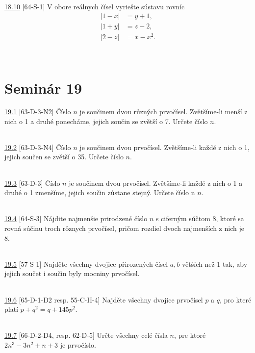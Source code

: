 \\

\noindent \ul{18.10} [64-S-1]
V obore reálnych čísel vyriešte sústavu rovníc
\begin{align*}
|1 - x| &= y + 1,\\
|1 + y| &= z - 2,\\
|2 - z| &= x - x^2.
\end{align*}

\\

\section*{Seminár 19}

\noindent \ul{19.1} [63-D-3-N2] Číslo $n$ je součinem dvou různých prvočísel.
Zvětšíme-li menší z nich o 1 a druhé ponecháme, jejich součin se zvětší o 7.
Určete číslo $n$.

\\

\noindent \ul{19.2} [63-D-3-N4] Číslo $n$ je součinem dvou prvočísel.
Zvětšíme-li každé z nich o 1, jejich součen se zvětší o 35. Určete číslo $n$.

\\

\noindent \ul{19.3} [63-D-3] Číslo $n$ je součinem dvou prvočísel. Zvětšíme-li
každé z nich o 1 a druhé o 1 zmenšíme, jejich součin zůstane stejný. Určete
číslo n $n$.

\\

\noindent \ul{19.4} [64-S-3]
Nájdite najmenšie prirodzené číslo $n$ s ciferným súčtom 8, ktoré sa rovná súčinu troch rôznych prvočísel, pričom rozdiel dvoch najmenších z nich je 8.


\\

\noindent \ul{19.5} [57-S-1]
Najděte všechny dvojice přirozených čísel $a, b$ větších než 1 tak, aby jejich součet i součin byly mocniny prvočísel.


\\

\noindent \ul{19.6} [65-D-1-D2 resp. 55-C-II-4] Najděte všechny dvojice
prvočísel $p$ a $q$, pro které platí $p + q^2= q + 145p^2$.


\\

\noindent \ul{19.7} [66-D-2-D4, resp. 62-D-5]
Určte všechny celé čísla $n$, pre ktoré $2n^3 -3n^2 +n+3$ je prvočíslo.


